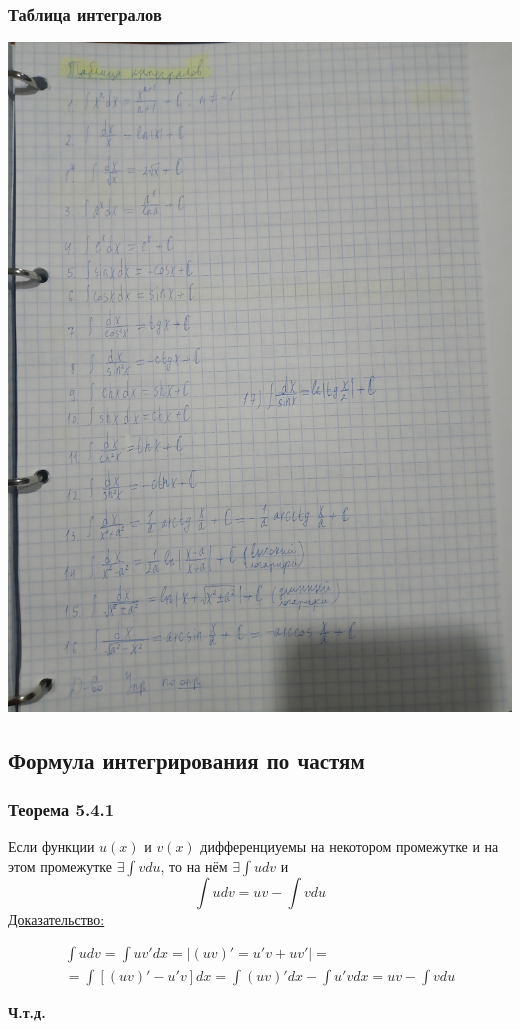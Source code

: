 \documentclass[12pt]{article}
\begin{document}
    \subsubsection*{Таблица интегралов}
    \includegraphics[width=0.7\linewidth,keepaspectratio]{5.3.1.png}

    \subsection{Формула интегрирования по частям}
    \subsubsection*{Теорема 5.4.1}\label{th:5.4.1}
    Если функции $u(x)$ и $v(x)$ дифференциуемы на некотором промежутке и на этом промежутке $\exists \int vdu$, то на нём $\exists \int udv$ и
    \[ \boxed{\int udv = uv - \int vdu} \]
    \underline{Доказательство:}
    \begin{adjustwidth}{1.5em}{1.5em}
        \begin{gather*}
            \int udv = \int uv'dx = \left| (uv)' = u'v + uv' \right| =\\
            = \int [(uv)' - u'v]dx = \int (uv)'dx - \int u'vdx = uv - \int vdu
        \end{gather*}
        \begin{center}
            \textbf{Ч.т.д.}
        \end{center}
    \end{adjustwidth}
\end{document}
